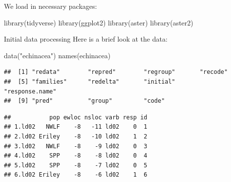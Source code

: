\documentclass[
  ignorenonframetext,
]{beamer}
\newenvironment{Shaded}{\begin{snugshade}}{\end{snugshade}}
\newcommand{\FunctionTok}[1]{\textcolor[rgb]{0.00,0.00,0.00}{#1}}
\newcommand{\NormalTok}[1]{#1}
\newcommand{\SpecialCharTok}[1]{\textcolor[rgb]{0.00,0.00,0.00}{#1}}
\newcommand{\StringTok}[1]{\textcolor[rgb]{0.31,0.60,0.02}{#1}}
\begin{document}
\begin{frame}[fragile]{}
\protect\hypertarget{section-1}{}
We load in necessary packages:

\vspace{12pt}

\begin{Shaded}
\begin{Highlighting}[]
\FunctionTok{library}\NormalTok{(tidyverse)}
\FunctionTok{library}\NormalTok{(ggplot2)}
\FunctionTok{library}\NormalTok{(aster)}
\FunctionTok{library}\NormalTok{(aster2)}
\end{Highlighting}
\end{Shaded}
\end{frame}

\begin{frame}[fragile]{Initial data processing}
\protect\hypertarget{initial-data-processing}{}
Here is a brief look at the data:

\vspace{12pt}
\tiny

\begin{Shaded}
\begin{Highlighting}[]
\FunctionTok{data}\NormalTok{(}\StringTok{"echinacea"}\NormalTok{)}
\FunctionTok{names}\NormalTok{(echinacea)}
\end{Highlighting}
\end{Shaded}

\begin{verbatim}
##  [1] "redata"        "repred"        "regroup"       "recode"       
##  [5] "families"      "redelta"       "initial"       "response.name"
##  [9] "pred"          "group"         "code"
\end{verbatim}

\begin{Shaded}
\end{Shaded}

\begin{verbatim}
##           pop ewloc nsloc varb resp id
## 1.ld02   NWLF    -8   -11 ld02    0  1
## 2.ld02 Eriley    -8   -10 ld02    1  2
## 3.ld02   NWLF    -8    -9 ld02    0  3
## 4.ld02    SPP    -8    -8 ld02    0  4
## 5.ld02    SPP    -8    -7 ld02    0  5
## 6.ld02 Eriley    -8    -6 ld02    1  6
\end{verbatim}
\end{frame}
\end{document}
